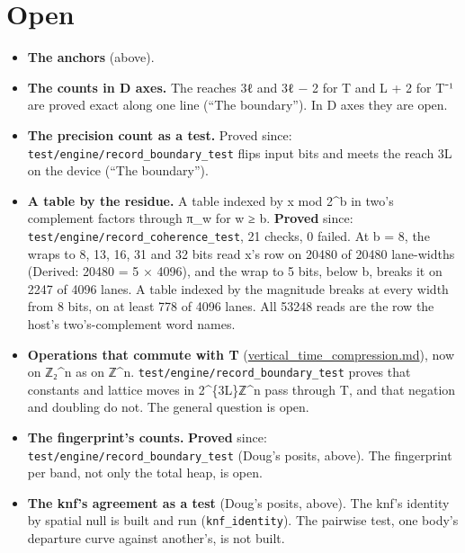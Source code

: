 \section{\texorpdfstring{Open}{Open}}

\begin{itemize}
\item \textbf{The anchors} (above).
\item \textbf{The counts in D axes.} The reaches 3ℓ and 3ℓ − 2 for T and L + 2 for T⁻¹ are proved exact along one line (“The boundary”). In D axes they are open.
\item \textbf{The precision count as a test.} Proved since: \texttt{test/\allowbreak{}engine/\allowbreak{}record\_\allowbreak{}boundary\_\allowbreak{}test} flips input bits and meets the reach 3L on the device (“The boundary”).
\item \textbf{A table by the residue.} A table indexed by x mod 2\textasciicircum{}b in two's complement factors through π\_\allowbreak{}w for w ≥ b. \textbf{Proved} since: \texttt{test/\allowbreak{}engine/\allowbreak{}record\_\allowbreak{}coherence\_\allowbreak{}test}, 21 checks, 0 failed. At b = 8, the wraps to 8, 13, 16, 31 and 32 bits read x's row on 20480 of 20480 lane-widths (Derived: 20480 = 5 × 4096), and the wrap to 5 bits, below b, breaks it on 2247 of 4096 lanes. A table indexed by the magnitude breaks at every width from 8 bits, on at least 778 of 4096 lanes. All 53248 reads are the row the host's two's-complement word names.
\item \textbf{Operations that commute with T} (\hyperref[chap:vertical-time-compression]{vertical\_\allowbreak{}time\_\allowbreak{}compression.md}), now on ℤ₂\textasciicircum{}n as on ℤ\textasciicircum{}n. \texttt{test/\allowbreak{}engine/\allowbreak{}record\_\allowbreak{}boundary\_\allowbreak{}test} proves that constants and lattice moves in 2\textasciicircum{}\{3L\}ℤ\textasciicircum{}n pass through T, and that negation and doubling do not. The general question is open.
\item \textbf{The fingerprint's counts.} \textbf{Proved} since: \texttt{test/\allowbreak{}engine/\allowbreak{}record\_\allowbreak{}boundary\_\allowbreak{}test} (Doug's posits, above). The fingerprint per band, not only the total heap, is open.
\item \textbf{The knf's agreement as a test} (Doug's posits, above). The knf's identity by spatial null is built and run (\texttt{knf\_\allowbreak{}identity}). The pairwise test, one body's departure curve against another's, is not built.

\end{itemize}
